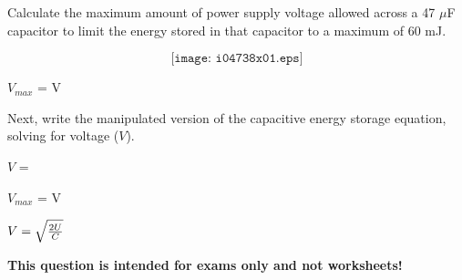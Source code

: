 

Calculate the maximum amount of power supply voltage allowed across a 47 $\mu$F capacitor to limit the energy stored in that capacitor to a maximum of 60 mJ.

\vskip 10pt

$$\texttt{[image: i04738x01.eps]}$$

$V_{max}$ = \underbar{\hskip 50pt} V

\vskip 10pt

Next, write the manipulated version of the capacitive energy storage equation, solving for voltage ($V$).

\vskip 10pt

$V$ = 







$V_{max}$ =  V

\vskip 10pt

$V = \sqrt{2 U \over C}$







{\bf This question is intended for exams only and not worksheets!}



